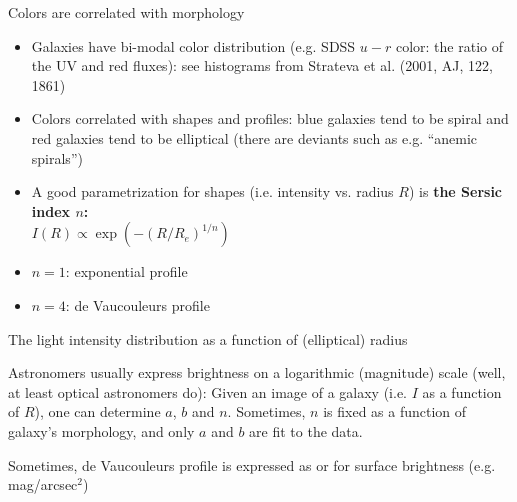 \documentclass[letterpaper,landscape]{slides}
\begin{document}
\begin{slide}
{\begin{minipage}[t]{7cm}
\begin{center}
\end{center}
\end{minipage}

\begin{minipage}[t]{17cm}
\begin{center}
{\large \color{red} Colors are correlated with morphology }
\end{center}

\begin{itemize}
\item
Galaxies have bi-modal color distribution (e.g. SDSS $u-r$ color: the 
ratio of the UV and red fluxes): see histograms from Strateva et al. (2001, AJ, 122, 1861) 

\item
Colors correlated with shapes and profiles: blue galaxies tend to be 
spiral and red galaxies tend to be elliptical (there are deviants such
as e.g. ``anemic spirals'')
\item A good parametrization for shapes (i.e. intensity vs. radius $R$) 
is {\bf the Sersic index $n$:} \\
      $I(R) \propto \exp(-(R/R_e)^{1/n})$
\item 
{\color{blue} $n=1$: exponential profile}
\item
{\color{red} $n=4$: de Vaucouleurs profile}
\end{itemize}  

\end{minipage}}
\vfill 
\end{slide}






\begin{slide}
\begin{center}
{\large \color{red} 
       The light intensity distribution as a function of (elliptical) radius  }
\end{center}


Astronomers usually express brightness on a logarithmic (magnitude) scale
(well, at least optical astronomers do):
Given an image of a galaxy (i.e. $I$ as a function of $R$), one can 
determine $a$, $b$ and $n$. Sometimes, $n$ is fixed as a function
of galaxy's morphology, and only $a$ and $b$ are fit to the data.

Sometimes, de Vaucouleurs profile is expressed as
or for surface brightness (e.g. mag/arcsec$^2$)


\vfill
\end{slide}
\end{document}
